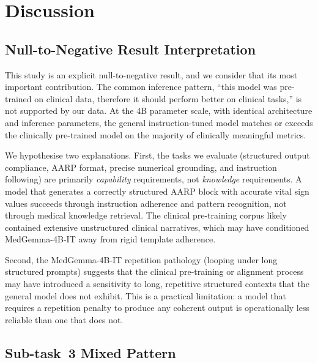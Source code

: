 \documentclass[sigconf,anonymous=false,review=false]{acmart}
\newcommand{\medgemma}{MedGemma-4B-IT\xspace}
\begin{document}
\section{Discussion}
\label{sec:discussion}

\subsection{Null-to-Negative Result Interpretation}

This study is an explicit null-to-negative result, and we consider that its
most important contribution. The common inference pattern, ``this model was
pre-trained on clinical data, therefore it should perform better on clinical
tasks,'' is not supported by our data. At the 4B parameter scale, with
identical architecture and inference parameters, the general instruction-tuned
model matches or exceeds the clinically pre-trained model on the majority of
clinically meaningful metrics.

We hypothesise two explanations. First, the tasks we evaluate (structured
output compliance, AARP format, precise numerical grounding, and instruction
following) are primarily \emph{capability} requirements, not \emph{knowledge}
requirements. A model that generates a correctly structured AARP block with
accurate vital sign values succeeds through instruction adherence and pattern
recognition, not through medical knowledge retrieval. The clinical pre-training
corpus likely contained extensive unstructured clinical narratives, which may
have conditioned \medgemma away from rigid template adherence.

Second, the \medgemma repetition pathology (looping under long structured
prompts) suggests that the clinical pre-training or alignment process may
have introduced a sensitivity to long, repetitive structured contexts that
the general model does not exhibit. This is a practical limitation: a model
that requires a repetition penalty to produce any coherent output is
operationally less reliable than one that does not.

\subsection{Sub-task~3 Mixed Pattern}
\end{document}
